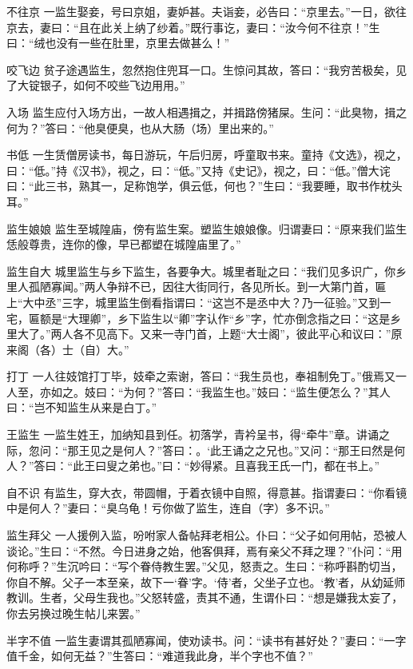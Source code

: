 \documentclass[12pt,UTF8]{ctexbook}
\begin{document}
不往京
一监生娶妾，号曰京姐，妻妒甚。夫诣妾，必告曰：“京里去。”一日，欲往京去，妻曰：“且在此关上纳了纱着。”既行事讫，妻曰：“汝今何不往京！”生曰：“绒也没有一些在肚里，京里去做甚么！”

咬飞边
贫子途遇监生，忽然抱住兜耳一口。生惊问其故，答曰：“我穷苦极矣，见了大锭银子，如何不咬些飞边用用。”

入场
监生应付入场方出，一故人相遇揖之，并揖路傍猪屎。生问：“此臭物，揖之何为？”答曰：“他臭便臭，也从大肠（场）里出来的。”

书低
一生赁僧房读书，每日游玩，午后归房，呼童取书来。童持《文选》，视之，曰：“低。”持《汉书》，视之，曰：“低。”又持《史记》，视之，曰：“低。”僧大诧曰：“此三书，熟其一，足称饱学，俱云低，何也？”生曰：“我要睡，取书作枕头耳。”

监生娘娘
监生至城隍庙，傍有监生案。塑监生娘娘像。归谓妻曰：“原来我们监生恁般尊贵，连你的像，早已都塑在城隍庙里了。”

监生自大
城里监生与乡下监生，各要争大。城里者耻之曰：“我们见多识广，你乡里人孤陋寡闻。”两人争辩不已，因往大街同行，各见所长。到一大第门首，匾上“大中丞”三字，城里监生倒看指谓曰：“这岂不是丞中大？乃一征验。”又到一宅，匾额是“大理卿”，乡下监生以“卿”字认作“乡”字，忙亦倒念指之曰：“这是乡里大了。”两人各不见高下。又来一寺门首，上题“大士阁”，彼此平心和议曰：”原来阁（各）士（自）大。”

打丁
一人往妓馆打丁毕，妓牵之索谢，答曰：“我生员也，奉祖制免丁。”俄焉又一人至，亦如之。妓曰：“为何？”答曰：“我监生也。”妓曰：“监生便怎么？”其人曰：“岂不知监生从来是白丁。”

王监生
一监生姓王，加纳知县到任。初落学，青衿呈书，得“牵牛”章。讲诵之际，忽问：“那王见之是何人？”答曰：。‘此王诵之之兄也。”又问：“那王曰然是何人？”答曰：“此王曰叟之弟也。”曰：“妙得紧。且喜我王氏一门，都在书上。”

自不识
有监生，穿大衣，带圆帽，于着衣镜中自照，得意甚。指谓妻曰：“你看镜中是何人？”妻曰：“臭乌龟！亏你做了监生，连自（字）多不识。”

监生拜父
一人援例入监，吩咐家人备帖拜老相公。仆曰：“父子如何用帖，恐被人谈论。”生曰：“不然。今日进身之始，他客俱拜，焉有亲父不拜之理？”仆问：“用何称呼？”生沉吟曰：“写个眷侍教生罢。”父见，怒责之。生曰：“称呼斟酌切当，你自不解。父子一本至亲，故下一‘眷’字。‘侍’者，父坐子立也。‘教’者，从幼延师教训。生者，父母生我也。”父怒转盛，责其不通，生谓仆曰：“想是嫌我太妄了，你去另换过晚生帖儿来罢。”

半字不值
一监生妻谓其孤陋寡闻，使劝读书。问：“读书有甚好处？”妻曰：“一字值千金，如何无益？”生答曰：“难道我此身，半个字也不值？”
\end{document}
